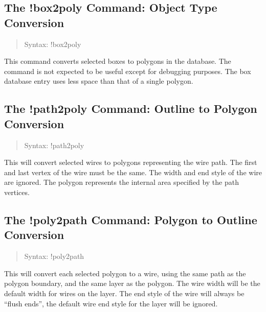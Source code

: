 \subsection{The {\cb !box2poly} Command: Object Type Conversion}
\begin{quote}
Syntax: {\vt !box2poly}
\end{quote}
This command converts selected boxes to polygons in the database.  The
command is not expected to be useful except for debugging purposes. 
The box database entry uses less space than that of a single polygon.

\subsection{The {\cb !path2poly} Command: Outline to Polygon
  Conversion}
\begin{quote}
Syntax: {\vt !path2poly}
\end{quote}
This will convert selected wires to polygons representing the wire
path.  The first and last vertex of the wire must be the same.  The
width and end style of the wire are ignored.  The polygon represents
the internal area specified by the path vertices.

\subsection{The {\cb !poly2path} Command: Polygon to Outline
  Conversion}
\begin{quote}
Syntax: {\vt !poly2path}
\end{quote}
This will convert each selected polygon to a wire, using the same path
as the polygon boundary, and the same layer as the polygon.  The wire
width will be the default width for wires on the layer.  The end style
of the wire will always be ``flush ends'', the default wire end style
for the layer will be ignored.

